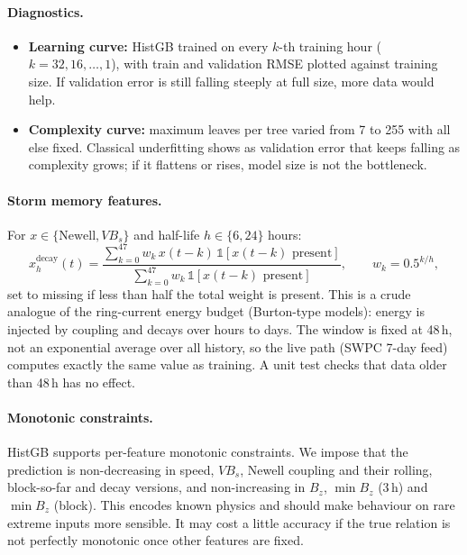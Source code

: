 \documentclass[11pt,a4paper]{article}
\begin{document}
\paragraph{Diagnostics.}
\begin{itemize}
\item \textbf{Learning curve:} HistGB trained on every $k$-th training hour ($k = 32, 16, \dots, 1$), with train
and validation RMSE plotted against training size. If validation error is still falling steeply at full size,
more data would help.
\item \textbf{Complexity curve:} maximum leaves per tree varied from 7 to 255 with all else fixed. Classical
underfitting shows as validation error that keeps falling as complexity grows; if it flattens or rises, model
size is not the bottleneck.
\end{itemize}

\paragraph{Storm memory features.} For $x \in \{\text{Newell}, VB_s\}$ and half-life $h \in \{6, 24\}$ hours:
\[
x^{\mathrm{decay}}_{h}(t) = \frac{\sum_{k=0}^{47} w_k\, x(t-k)\,\mathbb{1}[x(t-k)\text{ present}]}
{\sum_{k=0}^{47} w_k\,\mathbb{1}[x(t-k)\text{ present}]},\qquad w_k = 0.5^{k/h},
\]
set to missing if less than half the total weight is present. This is a crude analogue of the ring-current
energy budget (Burton-type models): energy is injected by coupling and decays over hours to days. The window is
fixed at 48\,h, not an exponential average over all history, so the live path (SWPC 7-day feed) computes exactly
the same value as training. A unit test checks that data older than 48\,h has no effect.

\paragraph{Monotonic constraints.} HistGB supports per-feature monotonic constraints. We impose that the
prediction is non-decreasing in speed, $VB_s$, Newell coupling and their rolling, block-so-far and decay
versions, and non-increasing in $B_z$, $\min B_z$ (3\,h) and $\min B_z$ (block). This encodes known physics and
should make behaviour on rare extreme inputs more sensible. It may cost a little accuracy if the true relation
is not perfectly monotonic once other features are fixed.
\end{document}
